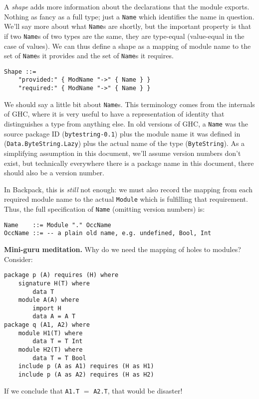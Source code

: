 \documentclass{article}
\newenvironment{aside}
  {\begin{mdframed}[style=0,%
      leftline=false,rightline=false,leftmargin=2em,rightmargin=2em,%
          innerleftmargin=0pt,innerrightmargin=0pt,linewidth=0.75pt,%
      skipabove=7pt,skipbelow=7pt]\small}
  {\end{mdframed}}
\begin{document}
A \emph{shape} adds more information about the declarations that the
module exports.  Nothing as fancy as a full type; just a \verb|Name|
which identifies the name in question.  We'll say more about what
\verb|Name|s are shortly, but the important property is that if two
\verb|Name|s of two types are the same, they are type-equal (value-equal
in the case of values).  We can thus define a shape as a mapping of
module name to the set of \verb|Name|s it provides and the set of
\verb|Name|s it requires.

\begin{verbatim}
Shape ::=
    "provided:" { ModName "->" { Name } }
    "required:" { ModName "->" { Name } }
\end{verbatim}

We should say a little bit about \verb|Name|s.  This terminology
comes from the internals of GHC, where it is very useful to have a
representation of identity that distinguishes a type from anything else.
In old versions of GHC, a \verb|Name| was the source package ID (\verb|bytestring-0.1|)
plus the module name it was defined in (\verb|Data.ByteString.Lazy|)
plus the actual name of the type (\verb|ByteString|).  As a simplifying assumption
in this document, we'll assume version numbers don't exist, but technically
everywhere there is a package name in this document, there should also be
a version number.

In Backpack, this is \emph{still} not enough: we must also record
the mapping from each required module name to the actual \verb|Module| which
is fulfilling that requirement. Thus, the full specification of \verb|Name|
(omitting version numbers) is:

\begin{verbatim}
Name    ::= Module "." OccName
OccName ::= -- a plain old name, e.g. undefined, Bool, Int
\end{verbatim}

\newpage

\begin{aside}
\textbf{Mini-guru meditation.}  Why do we need the mapping of holes to modules? Consider:
\begin{verbatim}
package p (A) requires (H) where
    signature H(T) where
        data T
    module A(A) where
        import H
        data A = A T
package q (A1, A2) where
    module H1(T) where
        data T = T Int
    module H2(T) where
        data T = T Bool
    include p (A as A1) requires (H as H1)
    include p (A as A2) requires (H as H2)
\end{verbatim}

If we conclude that \verb|A1.T| $=$ \verb|A2.T|, that would be
disaster!
\end{aside}
\end{document}
